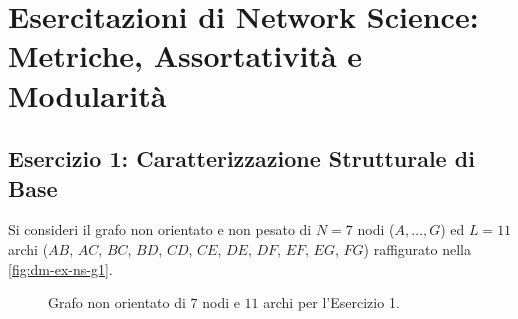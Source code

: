 \FloatBarrier
\section{Esercitazioni di Network Science: Metriche, Assortativit\`a e Modularit\`a}
\label{ch:dm-ex-network-science}

\subsection{Esercizio 1: Caratterizzazione Strutturale di Base}
\label{sec:dm-ex-ns-basic}

Si consideri il grafo non orientato e non pesato di $N = 7$ nodi ($A, \dots, G$) ed $L = 11$ archi ($AB$, $AC$, $BC$, $BD$, $CD$, $CE$, $DE$, $DF$, $EF$, $EG$, $FG$) raffigurato nella \autoref{fig:dm-ex-ns-g1}.

\begin{figure}[H]
\centering
{}
\caption{Grafo non orientato di $7$ nodi e $11$ archi per l'Esercizio 1.}
\label{fig:dm-ex-ns-g1}
\end{figure}

